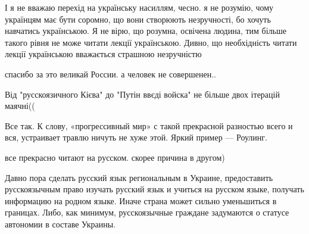 \begin{itemize}
\begin{itemize}
І я не вважаю перехід на українську насиллям, чесно. я не розумію, чому
українцям має бути соромно, що вони створюють незручності, бо хочуть навчатись
українською. Я не вірю, що розумна, освічена людина, тим більше такого рівня не
може читати лекції українською. Дивно, що необхідність читати лекції
українською вважається страшною незручністю

\end{itemize}

 
спасибо за это великай России. а человек не совершенен..

 
Від "русскоязичного Кієва" до "Путін ввєді войска" не більше двох ітерацій маячні((

 
Все так. К слову, «прогрессивный мир» с такой прекрасной разностью всего и вся,
устраивает травлю ничуть не хуже этой. Яркий пример — Роулинг.

 
все прекрасно читают на русском. скорее причина в другом)

 

Давно пора сделать русский язык региональным в Украине, предоставить
русскоязычным право изучать русский язык и учиться на русском языке, получать
информацию на родном языке. Иначе страна может сильно уменьшиться в границах.
Либо, как минимум, русскоязычные граждане задумаются о статусе автономии в
составе Украины.


\end{itemize}
